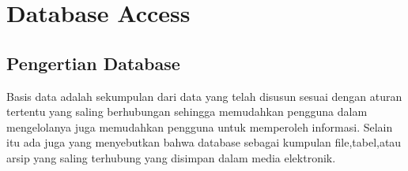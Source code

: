 
\section{Database Access}

\subsection{Pengertian Database}
	Basis data adalah sekumpulan dari data yang telah disusun sesuai dengan aturan tertentu yang saling berhubungan sehingga memudahkan pengguna dalam mengelolanya juga memudahkan pengguna untuk memperoleh informasi. Selain itu ada juga yang menyebutkan bahwa database sebagai kumpulan ﬁle,tabel,atau arsip yang saling terhubung yang disimpan dalam media elektronik.

